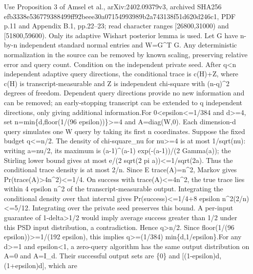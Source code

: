 \documentclass[10pt,a4paper]{article}
\begin{document}
\begingroup\raggedright\sloppy Use Proposition 3 of Amsel et al.,\allowbreak{} arXiv:\allowbreak{}2402.09379v3,\allowbreak{} archived SHA256 efb3338e536779388499ff92beee30a07154993989b2a743138f51d620d246c1,\allowbreak{} PDF p.11 and Appendix B.1,\allowbreak{} pp.22{\AtlasUnicodeText –}\allowbreak{}23;\allowbreak{} read character ranges [26800,\allowbreak{}31000) and [51800,\allowbreak{}59600). Only its adaptive Wishart posterior lemma is used. Let G have n-by-n independent standard normal entries and W=\allowbreak{}G\textasciicircum{}T G. Any deterministic normalization in the source can be removed by known scaling,\allowbreak{} preserving relative error and query count. Condition on the independent private seed. After q<n independent adaptive query directions,\allowbreak{} the conditional trace is c(H)+Z,\allowbreak{} where c(H) is transcript-measurable and Z is independent chi-square with (n-q)\textasciicircum{}2 degrees of freedom. Dependent query directions provide no new information and can be removed;\allowbreak{} an early-stopping transcript can be extended to q independent directions,\allowbreak{} only giving additional information.\newline{}For 0<epsilon<=\allowbreak{}1/\allowbreak{}384 and d>=\allowbreak{}4,\allowbreak{} set n=\allowbreak{}min\{d,\allowbreak{}floor(1/\allowbreak{}(96 epsilon))\}>=\allowbreak{}4 and A=\allowbreak{}diag(W,\allowbreak{}0). Each dimension-d query simulates one W query by taking its first n coordinates. Suppose the fixed budget q<=\allowbreak{}n/\allowbreak{}2. The density of chi-square\_\allowbreak{}nu for nu>=\allowbreak{}4 is at most 1/\allowbreak{}sqrt(nu):\allowbreak{} writing a=\allowbreak{}nu/\allowbreak{}2,\allowbreak{} its maximum is (a-1)\textasciicircum{}(a-1) exp(-(a-1))/\allowbreak{}(2 Gamma(a));\allowbreak{} the Stirling lower bound gives at most e/\allowbreak{}(2 sqrt(2 pi a))<=\allowbreak{}1/\allowbreak{}sqrt(2a). Thus the conditional trace density is at most 2/\allowbreak{}n. Since E trace(A)=\allowbreak{}n\textasciicircum{}2,\allowbreak{} Markov gives Pr(trace(A)>4n\textasciicircum{}2)<=\allowbreak{}1/\allowbreak{}4. On success with trace(A)<=\allowbreak{}4n\textasciicircum{}2,\allowbreak{} the true trace lies within 4 epsilon n\textasciicircum{}2 of the transcript-measurable output. Integrating the conditional density over that interval gives Pr(success)<=\allowbreak{}1/\allowbreak{}4+8 epsilon n\textasciicircum{}2(2/\allowbreak{}n)<=\allowbreak{}5/\allowbreak{}12. Integrating over the private seed preserves this bound. A per-input guarantee of 1-delta>1/\allowbreak{}2 would imply average success greater than 1/\allowbreak{}2 under this PSD input distribution,\allowbreak{} a contradiction. Hence q>n/\allowbreak{}2. Since floor(1/\allowbreak{}(96 epsilon))>=\allowbreak{}1/\allowbreak{}(192 epsilon),\allowbreak{} this implies q>=\allowbreak{}(1/\allowbreak{}384) min\{d,\allowbreak{}1/\allowbreak{}epsilon\}.\newline{}For any d>=\allowbreak{}1 and epsilon<1,\allowbreak{} a zero-query algorithm has the same output distribution on A=\allowbreak{}0 and A=\allowbreak{}I\_\allowbreak{}d. Their successful output sets are \{0\} and [(1-epsilon)d,\allowbreak{}(1+epsilon)d],\allowbreak{} which are 
\end{document}
